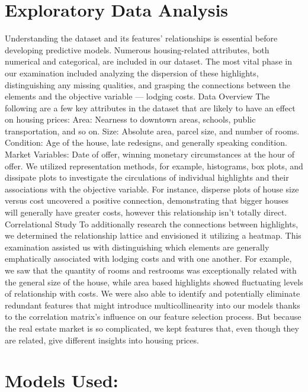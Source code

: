 \documentclass[10pt,conference,compsoc]{IEEEtran}
\begin{document}
{\section{Exploratory Data Analysis}
Understanding the dataset and its features' relationships is essential before developing predictive models. Numerous housing-related attributes, both numerical and categorical, are included in our dataset. The most vital phase in our examination included analyzing the dispersion of these highlights, distinguishing any missing qualities, and grasping the connections between the elements and the objective variable — lodging costs. Data Overview The following are a few key attributes in the dataset that are likely to have an effect on housing prices: Area: Nearness to downtown areas, schools, public transportation, and so on. Size: Absolute area, parcel size, and number of rooms. Condition: Age of the house, late redesigns, and generally speaking condition. Market Variables: Date of offer, winning monetary circumstances at the hour of offer. We utilized representation methods, for example, histograms, box plots, and dissipate plots to investigate the circulations of individual highlights and their associations with the objective variable. For instance, disperse plots of house size versus cost uncovered a positive connection, demonstrating that bigger houses will generally have greater costs, however this relationship isn't totally direct. Correlational Study To additionally research the connections between highlights, we determined the relationship lattice and envisioned it utilizing a heatmap. This examination assisted us with distinguishing which elements are generally emphatically associated with lodging costs and with one another. For example, we saw that the quantity of rooms and restrooms was exceptionally related with the general size of the house, while area based highlights showed fluctuating levels of relationship with costs. We were also able to identify and potentially eliminate redundant features that might introduce multicollinearity into our models thanks to the correlation matrix's influence on our feature selection process. But because the real estate market is so complicated, we kept features that, even though they are related, give different insights into housing prices.

\section{Models Used:}

}
\end{document}
